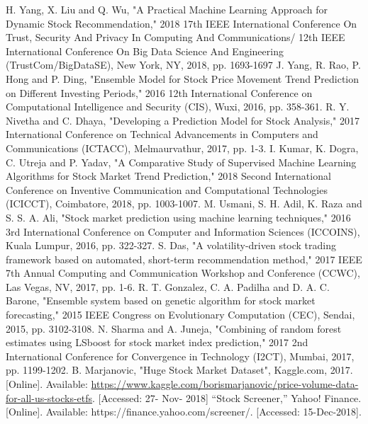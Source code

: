 \documentclass[journal]{IEEEtran}
\begin{document}
\begin{thebibliography}{}
H. Yang, X. Liu and Q. Wu, "A Practical Machine Learning Approach for Dynamic Stock Recommendation," 2018 17th IEEE International Conference On Trust, Security And Privacy In Computing And Communications/ 12th IEEE International Conference On Big Data Science And Engineering (TrustCom/BigDataSE), New York, NY, 2018, pp. 1693-1697
 J. Yang, R. Rao, P. Hong and P. Ding, "Ensemble Model for Stock Price Movement Trend Prediction on Different Investing Periods," 2016 12th International Conference on Computational Intelligence and Security (CIS), Wuxi, 2016, pp. 358-361.
R. Y. Nivetha and C. Dhaya, "Developing a Prediction Model for Stock Analysis," 2017 International Conference on Technical Advancements in Computers and Communications (ICTACC), Melmaurvathur, 2017, pp. 1-3.
I. Kumar, K. Dogra, C. Utreja and P. Yadav, "A Comparative Study of Supervised Machine Learning Algorithms for Stock Market Trend Prediction," 2018 Second International Conference on Inventive Communication and Computational Technologies (ICICCT), Coimbatore, 2018, pp. 1003-1007.
 M. Usmani, S. H. Adil, K. Raza and S. S. A. Ali, "Stock market prediction using machine learning techniques," 2016 3rd International Conference on Computer and Information Sciences (ICCOINS), Kuala Lumpur, 2016, pp. 322-327.
S. Das, "A volatility-driven stock trading framework based on automated, short-term recommendation method," 2017 IEEE 7th Annual Computing and Communication Workshop and Conference (CCWC), Las Vegas, NV, 2017, pp. 1-6.
R. T. Gonzalez, C. A. Padilha and D. A. C. Barone, "Ensemble system based on genetic algorithm for stock market forecasting," 2015 IEEE Congress on Evolutionary Computation (CEC), Sendai, 2015, pp. 3102-3108.
N. Sharma and A. Juneja, "Combining of random forest estimates using LSboost for stock market index prediction," 2017 2nd International Conference for Convergence in Technology (I2CT), Mumbai, 2017, pp. 1199-1202.
B. Marjanovic, "Huge Stock Market Dataset", Kaggle.com, 2017. [Online]. Available: \url{https://www.kaggle.com/borismarjanovic/price-volume-data-for-all-us-stocks-etfs}. [Accessed: 27- Nov- 2018]
“Stock Screener,” Yahoo! Finance. [Online]. Available: https://finance.yahoo.com/screener/. [Accessed: 15-Dec-2018].
\end{thebibliography}
\end{document}
